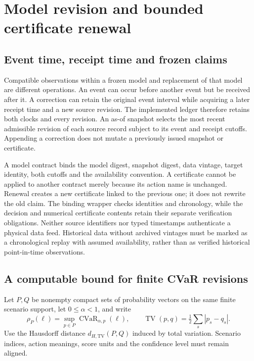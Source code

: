 \documentclass[11pt,a4paper]{article}
\theoremstyle{definition}\newtheorem{definition}[theorem]{Definition}
\begin{document}
\section{Model revision and bounded certificate renewal}\label{sec:renewal}
\subsection{Event time, receipt time and frozen claims}
Compatible observations within a frozen model and replacement of that model are different operations. An event can occur before another event but be received after it. A correction can retain the original event interval while acquiring a later receipt time and a new source revision. The implemented ledger therefore retains both clocks and every revision. An as-of snapshot selects the most recent admissible revision of each source record subject to its event and receipt cutoffs. Appending a correction does not mutate a previously issued snapshot or certificate.

A model contract binds the model digest, snapshot digest, data vintage, target identity, both cutoffs and the availability convention. A certificate cannot be applied to another contract merely because its action name is unchanged. Renewal creates a new certificate linked to the previous one; it does not rewrite the old claim. The binding wrapper checks identities and chronology, while the decision and numerical certificate contents retain their separate verification obligations. Neither source identifiers nor typed timestamps authenticate a physical data feed. Historical data without archived vintages must be marked as a chronological replay with assumed availability, rather than as verified historical point-in-time observations.

\subsection{A computable bound for finite CVaR revisions}
Let $P,Q$ be nonempty compact sets of probability vectors on the same finite scenario support, let $0\le\alpha<1$, and write
\[
 \rho_P(\ell)=\sup_{p\in P}\operatorname{CVaR}_{\alpha,p}(\ell),\qquad
 \operatorname{TV}(p,q)=\tfrac12\sum_s|p_s-q_s|.
\]
Use the Hausdorff distance $d_{H,\mathrm{TV}}(P,Q)$ induced by total variation. Scenario indices, action meanings, score units and the confidence level must remain aligned.
\end{document}
